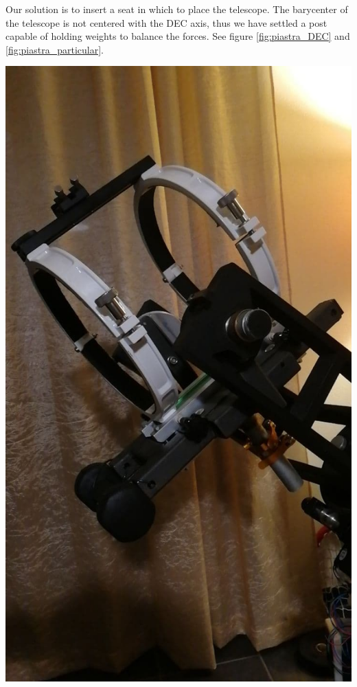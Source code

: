 \documentclass{article}
\begin{document}
\begin{multicols}{2}
        Our solution is to insert a seat in which to place the telescope.
        The barycenter of the telescope is not centered with the DEC axis, thus we have settled a post capable of holding weights to balance the forces.
        See figure \ref{fig:piastra_DEC} and \ref{fig:piastra_particular}.
        \\
        \begin{minipage}{0.5\textwidth}
            \centering
            \includegraphics[scale=0.5]{images/DEC_sede.jpg}

\end{minipage}
\end{multicols}
\end{document}
